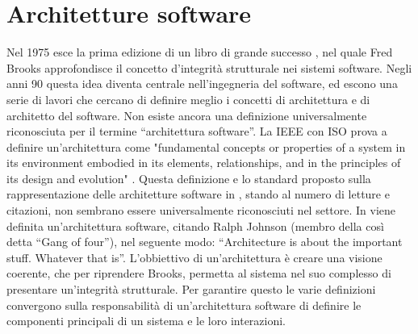 \documentclass[12pt]{report}
\begin{document}
\section{Architetture software}
Nel 1975 esce la prima edizione di un libro di grande successo \cite{brooks_jr_mythical_1974}, nel quale Fred Brooks approfondisce il concetto d'integrità strutturale nei sistemi software.
Negli anni 90 questa idea diventa centrale nell'ingegneria del software, ed escono una serie di lavori che  cercano di definire meglio i concetti di architettura e di architetto del software. 
Non esiste ancora una definizione universalmente riconosciuta per il termine ``architettura software''.
La IEEE con ISO prova a definire un'architettura come "fundamental concepts or properties of a system in its environment embodied in its elements, relationships, and in the principles of its design and evolution" \cite{isoiecieee_2011}.
Questa definizione e lo standard proposto sulla rappresentazione delle architetture software in \cite{isoiecieee_2011}, stando al numero di letture e citazioni, non sembrano essere universalmente riconosciuti nel settore.
In \cite{whoneedsanArchitect} viene definita un'architettura software, citando Ralph Johnson (membro della così detta ``Gang of four''), nel seguente modo: ``Architecture is about the important stuff. Whatever that is''. 
L'obbiettivo di un'architettura è creare una visione coerente, che per riprendere Brooks, permetta al sistema nel suo complesso di presentare un'integrità strutturale. 
Per garantire questo le varie definizioni convergono sulla responsabilità di un'architettura software di definire le componenti principali di un sistema e le loro interazioni.
\end{document}
